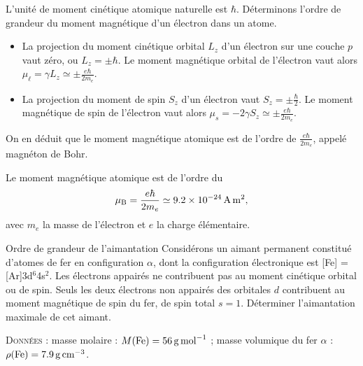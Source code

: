 \documentclass[12pt,fancy]{cours}
\begin{document}
 L'unité de moment cinétique atomique naturelle est $\hbar$. Déterminons l'ordre de grandeur du moment magnétique d'un électron dans un atome. \begin{itemize}
  \item La projection du moment cinétique orbital $L_z$ d'un électron sur une couche $p$ vaut zéro, ou $L_z = \pm \hbar$. Le moment magnétique orbital de l'électron vaut alors $\mu_\ell = \gamma L_z \simeq \pm \frac{e\hbar}{2m_e}$.
  \item La projection du moment de spin $S_z$ d'un électron vaut $S_z = \pm \frac{\hbar}{2}$. Le moment magnétique de spin de l'électron vaut alors $\mu_s = -2\gamma S_z \simeq \pm \frac{e\hbar}{2m_e}$.
\end{itemize}
On en déduit que le moment magnétique atomique est de l'ordre de $\frac{e\hbar}{2m_e}$,  appelé magnéton de Bohr.
\begin{definition}\label{prop:}
  Le moment magnétique atomique est de l'ordre du 
  \begin{equation*}
  \mu_{\rm{B}}=\frac{e\hbar}{2m_e} \simeq \SI{9.2e-24}{A.m^2},
 \end{equation*}
 avec $m_e$ la masse de l'électron et $e$ la charge élémentaire.
\end{definition}

\begin{exemple}{Ordre de grandeur de l'aimantation}
  Considérons un aimant permanent constitué d'atomes de fer en configuration $\alpha$, dont la configuration électronique est [Fe] = [Ar]3d$^6$4s$^2$. Les électrons appairés ne contribuent pas au moment cinétique orbital ou de spin. Seuls les deux électrons non appairés des orbitales $d$ contribuent au moment magnétique de spin du fer, de spin total $s=1$.
  Déterminer l'aimantation maximale de cet aimant.

  \textsc{Données} : masse molaire : $M({\rm Fe}) = \SI{56}{g.mol^{-1}}$ ;  masse volumique du fer $\alpha$ : $\rho({\rm Fe}) = \SI{7.9}{g.cm^{-3}}$.
\end{exemple}
\end{document}
